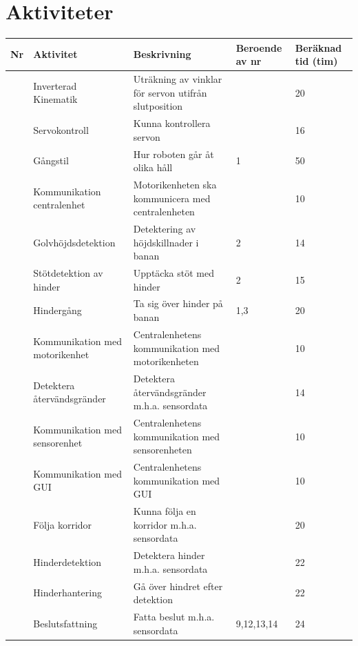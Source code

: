 \documentclass[a4paper,titlepage,12pt]{article}
\newcounter{aktNr}
\newcommand{\nextAktNr}{\stepcounter{aktNr}\arabic{aktNr}}
\begin{document}
	\section{Aktiviteter}
	\renewcommand*{\arraystretch}{1.4}
	\begin{longtable}[c]{ c p{4cm} p{6cm} p{2cm} p{2cm}}
		\textbf{Nr} & \textbf{Aktivitet} & \textbf{Beskrivning} & \textbf{Beroende av nr} & \textbf{Beräknad tid (tim)} \\ \midrule
		\nextAktNr{} & Inverterad Kinematik & Uträkning av vinklar för servon utifrån slutposition &  & 20 \\ \midrule
		\nextAktNr{} & Servokontroll & Kunna kontrollera servon &  & 16 \\ \midrule
		\nextAktNr{} & Gångstil & Hur roboten går åt olika håll & 1 & 50 \\ \midrule
		\nextAktNr{} & Kommunikation centralenhet & Motorikenheten ska kommunicera med centralenheten &  & 10 \\ \midrule
		\nextAktNr{} & Golvhöjdsdetektion & Detektering av höjdskillnader i banan & 2 & 14 \\ \midrule
		\nextAktNr{} & Stötdetektion av hinder & Upptäcka stöt med hinder & 2 & 15 \\ \midrule
		\nextAktNr{} & Hindergång & Ta sig över hinder på banan & 1,3 & 20 \\ \midrule
		\nextAktNr{} & Kommunikation med motorikenhet & Centralenhetens kommunikation med motorikenheten &  & 10 \\ \midrule
		\nextAktNr{} & Detektera återvändsgränder & Detektera återvändsgränder
                                                m.h.a. sensordata &  & 14 \\ \midrule
		\nextAktNr{} & Kommunikation med sensorenhet & Centralenhetens kommunikation
                                                   med sensorenheten &  & 10 \\ \midrule
		\nextAktNr{} & Kommunikation med GUI & Centralenhetens kommunikation med GUI &  & 10 \\ \midrule
		\nextAktNr{} & Följa korridor & Kunna följa en korridor m.h.a. sensordata &  & 20 \\ \midrule
		\nextAktNr{} & Hinderdetektion & Detektera hinder m.h.a. sensordata &  & 22 \\ \midrule
		\nextAktNr{} & Hinderhantering & Gå över hindret efter detektion &  & 22 \\ \midrule
		\nextAktNr{} & Beslutsfattning & Fatta beslut m.h.a. sensordata & 9,12,13,14 & 24 \\ \midrule

\end{longtable}
\end{document}
